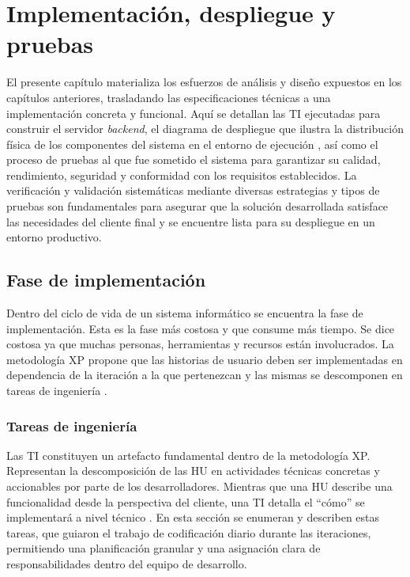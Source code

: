 \chapter{Implementación, despliegue y pruebas}
\label{chap:chapter3}

El presente capítulo materializa los esfuerzos de análisis y diseño expuestos en los capítulos anteriores,
trasladando las especificaciones técnicas a una implementación concreta y funcional. Aquí se detallan las
\ac{TI} ejecutadas para construir el servidor \textit{backend}, el diagrama de despliegue que ilustra la 
distribución física de los componentes del sistema en el entorno de ejecución , así como el proceso de 
pruebas al que fue sometido el sistema para garantizar su
calidad, rendimiento, seguridad y conformidad con los requisitos establecidos. La verificación y validación
sistemáticas mediante diversas estrategias y tipos de pruebas son fundamentales para asegurar que la 
solución desarrollada satisface las necesidades del cliente final y se encuentre lista para su
despliegue en un entorno productivo.


\section{Fase de implementación}

Dentro del ciclo de vida de un sistema informático se encuentra la fase de implementación. Esta
es la fase más costosa y que consume más tiempo. Se dice costosa ya que muchas personas,
herramientas y recursos están involucrados. La metodología \ac{XP} propone que las historias de
usuario deben ser implementadas en dependencia de la iteración a la que pertenezcan y las
mismas se descomponen en tareas de ingeniería \citep{maida2015}.

\subsection{Tareas de ingeniería}

Las \ac{TI} constituyen un artefacto fundamental dentro de la metodología \ac{XP}. 
Representan la descomposición de las \ac{HU} en actividades técnicas concretas y accionables por parte de los
desarrolladores. Mientras que una \ac{HU} describe una funcionalidad desde la perspectiva del cliente, una \ac{TI}
detalla el “cómo” se implementará a nivel técnico \citep{pressman2014se}. En esta sección se enumeran y describen 
estas tareas, que guiaron el trabajo de codificación diario durante las iteraciones, permitiendo una
planificación granular y una asignación clara de responsabilidades dentro del equipo de desarrollo.

